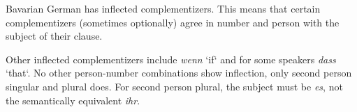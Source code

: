 \begin{exercise}
    Bavarian German has inflected complementizers.
    This means that certain complementizers (sometimes optionally) agree in number and person with the subject of their clause.
    \begin{exe}
        \ex
        \begin{xlist}
        \end{xlist}
    \end{exe}
    Other inflected complementizers include \emph{wenn} `if` and for some speakers \emph{dass} `that`.
    No other person-number combinations show inflection, only second person singular and plural does.
    For second person plural, the subject must be \emph{es}, not the semantically equivalent \emph{ihr}.


\end{exercise}
